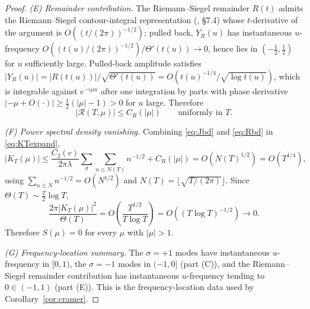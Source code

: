 \documentclass[11pt]{article}
\begin{document}
\begin{proof}
\medskip
\noindent\emph{(E) Remainder contribution.} The Riemann--Siegel remainder $R(t)$ admits the Riemann--Siegel contour-integral representation (\cite{Edwards}, \S7.4) whose $t$-derivative of the argument is $O((t/(2\pi))^{-1/2})$; pulled back, $Y_R(u)$ has instantaneous $u$-frequency $O((t(u)/(2\pi))^{-1/2})/\Theta'(t(u))\to 0$, hence lies in $(-\tfrac12,\tfrac12)$ for $u$ sufficiently large. Pulled-back amplitude satisfies $|Y_R(u)|=|R(t(u))|/\sqrt{\Theta'(t(u))}=O(t(u)^{-1/4}/\sqrt{\log t(u)})$, which is integrable against $e^{-i\mu u}$ after one integration by parts with phase derivative $|-\mu+O(\cdot)|\ge\tfrac12(|\mu|-1)>0$ for $u$ large. Therefore
\begin{equation}\label{eq:Rbd}
|\mathcal R(T,\mu)|\le C_R(|\mu|)\qquad\text{uniformly in }T.
\end{equation}

\medskip
\noindent\emph{(F) Power spectral density vanishing.} Combining \eqref{eq:Jbd} and \eqref{eq:Rbd} in \eqref{eq:KTexpand},
\begin{equation}\label{eq:KTbound}
|K_T(\mu)|\le\frac{C_2(c)}{2\pi\lambda}\sum_{\sigma}\sum_{n\le N(T)}n^{-1/2}+C_R(|\mu|)=O(N(T)^{1/2})=O(T^{1/4}),
\end{equation}
using $\sum_{n\le N}n^{-1/2}=O(N^{1/2})$ and $N(T)=\lfloor\sqrt{T/(2\pi)}\rfloor$. Since $\Theta(T)\sim\tfrac{T}{2}\log T$,
\begin{equation}\label{eq:PSDupper}
\frac{2\pi|K_T(\mu)|^2}{\Theta(T)}=O\!\left(\frac{T^{1/2}}{T\log T}\right)=O((T\log T)^{-1/2})\longrightarrow 0.
\end{equation}
Therefore $S(\mu)=0$ for every $\mu$ with $|\mu|>1$.

\medskip
\noindent\emph{(G) Frequency-location summary.} The $\sigma=+1$ modes have instantaneous $u$-frequency in $[0,1)$, the $\sigma=-1$ modes in $(-1,0]$ (part (C)), and the Riemann--Siegel remainder contribution has instantaneous $u$-frequency tending to $0\in(-1,1)$ (part (E)). This is the frequency-location data used by Corollary~\ref{cor:cramer}.

\end{proof}
\end{document}
